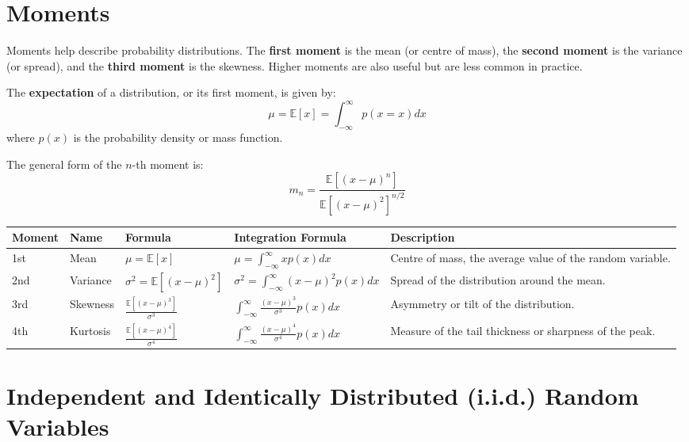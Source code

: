 \section{Moments}

Moments help describe probability distributions. The \textbf{first moment} is the mean (or centre of mass), the \textbf{second moment} is the variance (or spread), and the \textbf{third moment} is the skewness. Higher moments are also useful but are less common in practice.

The \textbf{expectation} of a distribution, or its first moment, is given by:
\[
\mu = \mathbb{E}[x] = \int_{-\infty}^{\infty} p(x = x) dx
\]
where $p(x)$ is the probability density or mass function.

The general form of the $n$-th moment is:
\[
m_n = \frac{\mathbb{E}[(x - \mu)^n]}{\mathbb{E}[(x - \mu)^2]^{n/2}}
\]




\begin{table*}[h]
    \centering
    \begin{tabularx}{\textwidth}{@{}p{} p{} p{} p{} p{}@{}}
        \toprule
        \textbf{Moment} & \textbf{Name} & \textbf{Formula} & \textbf{Integration Formula} & \textbf{Description} \\ \midrule
        1st  & Mean & $\mu = \mathbb{E}[x]$ & $\mu = \int_{-\infty}^{\infty} x p(x) dx$ & Centre of mass, the average value of the random variable. \\
        2nd  & Variance & $\sigma^2 = \mathbb{E}[(x - \mu)^2]$ & $\sigma^2 = \int_{-\infty}^{\infty} (x - \mu)^2 p(x) dx$ & Spread of the distribution around the mean. \\
        3rd  & Skewness & $\frac{\mathbb{E}[(x - \mu)^3]}{\sigma^3}$ & $\int_{-\infty}^{\infty} \frac{(x - \mu)^3}{\sigma^3} p(x) dx$ & Asymmetry or tilt of the distribution. \\
        4th  & Kurtosis & $\frac{\mathbb{E}[(x - \mu)^4]}{\sigma^4}$ & $\int_{-\infty}^{\infty} \frac{(x - \mu)^4}{\sigma^4} p(x) dx$ & Measure of the tail thickness or sharpness of the peak. \\ \bottomrule
    \end{tabularx}
\end{table*}



\section{Independent and Identically Distributed (i.i.d.) Random Variables}

